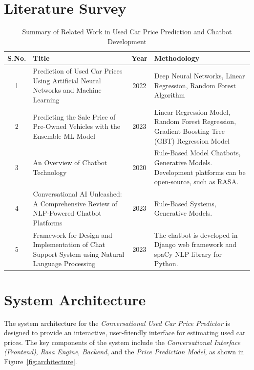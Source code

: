 \documentclass[a4paper,12pt]{article}
\begin{document}
\section{Literature Survey}

\begin{table}[ht]
\centering
\footnotesize
\begin{tabular}{|c|m{6cm}|c|m{6cm}|}
    \hline
    \textbf{S.No.} & \textbf{Title} & \textbf{Year} & \textbf{Methodology} \\ \hline
    1 & Prediction of Used Car Prices Using Artificial Neural Networks and Machine Learning & 2022 & Deep Neural Networks, Linear Regression, Random Forest Algorithm \\ \hline
    2 & Predicting the Sale Price of Pre-Owned Vehicles with the Ensemble ML Model & 2023 & Linear Regression Model, Random Forest Regression, Gradient Boosting Tree (GBT) Regression Model \\ \hline
    3 & An Overview of Chatbot Technology & 2020 & Rule-Based Model Chatbots, Generative Models. Development platforms can be open-source, such as RASA. \\ \hline
    4 & Conversational AI Unleashed: A Comprehensive Review of NLP-Powered Chatbot Platforms & 2023 & Rule-Based Systems, Generative Models. \\ \hline
    5 & Framework for Design and Implementation of Chat Support System using Natural Language Processing & 2023 & The chatbot is developed in Django web framework and spaCy NLP library for Python. \\ \hline
\end{tabular}
\label{table:lit_survey}
\caption{\footnotesize Summary of Related Work in Used Car Price Prediction and Chatbot Development}
\end{table}


\section{System Architecture}
The system architecture for the \textit{Conversational Used Car Price Predictor} is designed to provide an interactive, user-friendly interface for estimating used car prices. The key components of the system include the \textit{Conversational Interface (Frontend)}, \textit{Rasa Engine}, \textit{Backend}, and the \textit{Price Prediction Model}, as shown in Figure~\ref{fig:architecture}.
\end{document}
